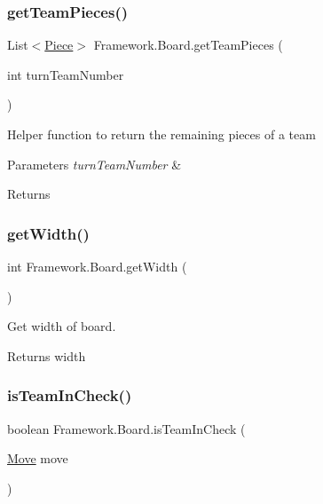 \subsubsection{\texorpdfstring{get\+Team\+Pieces()}{getTeamPieces()}}
{\footnotesize\ttfamily List$<$\hyperlink{class_framework_1_1_pieces_1_1_piece}{Piece}$>$ Framework.\+Board.\+get\+Team\+Pieces (\begin{DoxyParamCaption}\item[{int}]{turn\+Team\+Number }\end{DoxyParamCaption})}

Helper function to return the remaining pieces of a team 
\begin{DoxyParams}{Parameters}
{\em turn\+Team\+Number} & \\
\hline
\end{DoxyParams}
\begin{DoxyReturn}{Returns}

\end{DoxyReturn}
\hypertarget{class_framework_1_1_board_a926863b1b61235e17043cc12ce8d00ac}{}\label{class_framework_1_1_board_a926863b1b61235e17043cc12ce8d00ac} 
\subsubsection{\texorpdfstring{get\+Width()}{getWidth()}}
{\footnotesize\ttfamily int Framework.\+Board.\+get\+Width (\begin{DoxyParamCaption}{ }\end{DoxyParamCaption})}

Get width of board. \begin{DoxyReturn}{Returns}
width 
\end{DoxyReturn}
\hypertarget{class_framework_1_1_board_a5684a04e19215778fd062cad9659ffb3}{}\label{class_framework_1_1_board_a5684a04e19215778fd062cad9659ffb3} 
\subsubsection{\texorpdfstring{is\+Team\+In\+Check()}{isTeamInCheck()}}
{\footnotesize\ttfamily boolean Framework.\+Board.\+is\+Team\+In\+Check (\begin{DoxyParamCaption}\item[{\hyperlink{class_framework_1_1_move}{Move}}]{move }\end{DoxyParamCaption})}

